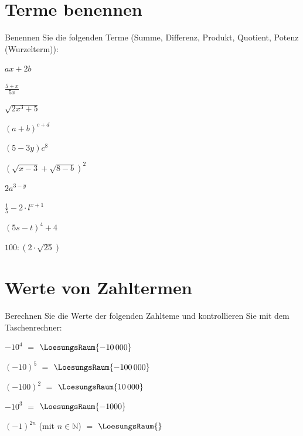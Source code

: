 
\renewcommand{\bbwAufgabenBlockID}{A1Te}

\renewcommand{\metaHeaderLine}{Aufgabenblatt}
\renewcommand{\arbeitsblattTitel}{Algebra: Terme}



\arbeitsblattHeader{}
\section{Terme benennen}
Benennen Sie die folgenden Terme (Summe, Differenz, Produkt, Quotient,
Potenz (Wurzelterm)):

\begin{bbwAufgabenBlock}
\item $ax+2b$ \, 
\item $\frac{5+x}{5x}$ \, 
\item $\sqrt{2x^3+5}$ \, 
\item $(a+b)^{c+d}$ \, 
\item $(5-3y)c^8$ \, 
\item $(\sqrt{x-3}+\sqrt{8-b})^2$ \, 
\item $2a^{3-y}$ \, \newpage
\item $\frac15 - 2\cdot{}l^{x+1}$ \, 
\item $(5s-t)^4+4$ \, 
\item $100:(2\cdot{}\sqrt{25})$ \, 
\end{bbwAufgabenBlock}

\newpage


\section{Werte von Zahltermen}
Berechnen Sie die Werte der folgenden Zahlteme und kontrollieren Sie
mit dem Taschenrechner:

\begin{bbwAufgabenBlock}
\item $-10^4$ $=$ $\LoesungsRaum{-10\,000}$
\item $(-10)^5$ $=$ $\LoesungsRaum{-100\,000}$
\item $(-100)^2$ $=$ $\LoesungsRaum{10\,000}$
\item $-10^3$ $=$ $\LoesungsRaum{-1000}$
\item $(-1)^{2n}$  (mit $n\in\mathbb{N}$)  $=$ $\LoesungsRaum{}$
\end{bbwAufgabenBlock}

